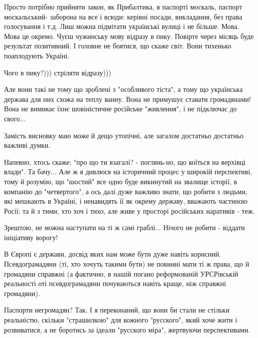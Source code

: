 
\begin{cmtfront}

Просто потрібно прийняти закон, як Прибалтика, в паспорті москаль, паспорт
москальський- заборона на все і всюди: керівні посади, викладання, без права
голосування і т.д. Лиш можна підмітати українські вулиці і не більше. Мова.
Мова це окремо. Чуєш чужинську мову відразу в пику. Повірте через місяць буде
результат позитивний. І головне не боятися, що скаже світ. Вони тихенько
поаплодують Україні.	


Чого в пику?))) стріляти відразу)))

\end{cmtfront}

Але вони такі не тому що зроблені з "особливого тіста", а тому що українська
держава для них схожа на теплу ванну. Вона не примушує ставати громадянами!
Вона не вимикає їхнє шовіністичне російське "живлення", і не підключає до
свого...

Замість висновку маю може й дещо утопічні, але загалом достатньо достатньо
важливі думки.  

Напевно, хтось скаже: "про що ти взагалі? - поглянь-но, що коїться на верхівці
влади". Та бачу... Але ж я дивлюся на історичний процес у широкій перспективі,
тому й розумію, що "шостий" все одно буде викинутий на звалище історії, в
компанію до "четвертого", а ось далі дуже важливо знати, що робити з людьми,
які мешкають в Україні, і ненавидять її як окрему державу, вважають частиною
Росії; та й з тими, хто хоч і тихо, але живе у просторі російських наративів -
теж.

Зрештою, не можна наступати на ті ж самі граблі... Нічого не робити - віддати
ініціативу ворогу!

В Європі є держави, досвід яких нам може бути дуже навіть корисний.
Псевдограмадяни (ті, хто хочуть такими бути) не повинні мати ті ж права, що й
громадяни справжні (а фактично, в нашій погано реформованій УРСРівській
реальності оті псевдограмадяни почуваються навіть краще, ніж справжні
громадяни).

Паспорти негромадян? Так. І я переконаний, що вони би стали не стільки
реальністю, скільки "страшилкою" для кожного "русского", який хоче жити і
розвиватися, а не боротись за ідеали "русского міра", жертвуючи перспективами.

